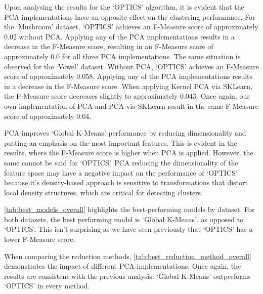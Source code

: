 Upon analysing the results for the `OPTICS' algorithm, it is evident that the PCA implementations
have an opposite effect on the clustering performance. For the `Mushroom' dataset, `OPTICS' achieves
an F-Measure score of approximately 0.02 without PCA. Applying any of the PCA implementations
results in a decrease in the F-Measure score, resulting in an F-Measure score of approximately 0.0 
for all three PCA implementations.
The same situation is observed for the `Vowel' dataset. Without PCA, `OPTICS' achieves an F-Measure score
of approximately 0.058. Applying any of the PCA implementations results in a decrease in the F-Measure score.
When applying Kernel PCA via SKLearn, the F-Measure score decreases slightly to approximately 0.043.
Once again, our own implementation of PCA and PCA via SKLearn result in the same F-Measure
score of approximately 0.04.

PCA improves `Global K-Means' performance by reducing dimensionality and putting 
an emphasis on the most important features. This is evident in the results, where the
F-Measure score is higher when PCA is applied. However, the same cannot be said for `OPTICS'.
PCA reducing the dimensionality of the feature space may have a negative
impact on the performance of `OPTICS' because it's density-based approach is sensitive
to transformations that distort local density structures, which are critical for detecting
clusters\cite{sepin2023comparisonclusteringalgorithmsstatistical}.

\vspace{1em}

\autoref{tab:best_models_overall} highlights the best-performing models by dataset.
For both datasets, the best performing model is `Global K-Means', as opposed to `OPTICS'.
This isn't surprising as we have seen previously that `OPTICS' has a lower F-Measure score.



When comparing the reduction methods, \autoref{tab:best_reduction_method_overall} demonstrates the impact of
different PCA implementations. Once again, the results are consistent with the previous analysis:
`Global K-Means' outperforms `OPTICS' in every method. 

